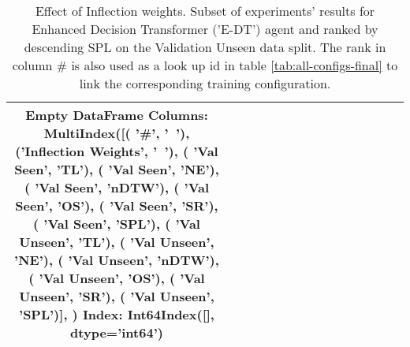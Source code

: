 \begin{table}
\centering
\caption{\label{tab:e_dt_inflection_weights}Effect of Inflection weights. Subset of experiments' results for Enhanced Decision Transformer ('E-DT') agent and ranked by descending SPL on the Validation Unseen data split. The rank in column \# is also used as a look up id in table \ref{tab:all-configs-final} to link the corresponding training configuration.}
\begin{tabular}{@{\hskip3pt}c@{\hskip3pt}c@{\hskip3pt}c@{\hskip3pt}c@{\hskip3pt}c@{\hskip3pt}c@{\hskip3pt}c@{\hskip3pt}c@{\hskip3pt}c@{\hskip3pt}c@{\hskip3pt}c@{\hskip3pt}c@{\hskip3pt}c@{\hskip3pt}c@{\hskip3pt}c}
\toprule
Empty DataFrame
Columns: MultiIndex([(                '\textbf{\#}',    '\textbf{~}'),
            ('\textbf{Inflection Weights}',    '\textbf{~}'),
            (          '\textbf{Val Seen}',   '\textbf{TL}'),
            (          '\textbf{Val Seen}',   '\textbf{NE}'),
            (          '\textbf{Val Seen}', '\textbf{nDTW}'),
            (          '\textbf{Val Seen}',   '\textbf{OS}'),
            (          '\textbf{Val Seen}',   '\textbf{SR}'),
            (          '\textbf{Val Seen}',  '\textbf{SPL}'),
            (        '\textbf{Val Unseen}',   '\textbf{TL}'),
            (        '\textbf{Val Unseen}',   '\textbf{NE}'),
            (        '\textbf{Val Unseen}', '\textbf{nDTW}'),
            (        '\textbf{Val Unseen}',   '\textbf{OS}'),
            (        '\textbf{Val Unseen}',   '\textbf{SR}'),
            (        '\textbf{Val Unseen}',  '\textbf{SPL}')],
           )
Index: Int64Index([], dtype='int64') \\
\bottomrule
\end{tabular}
\end{table}
